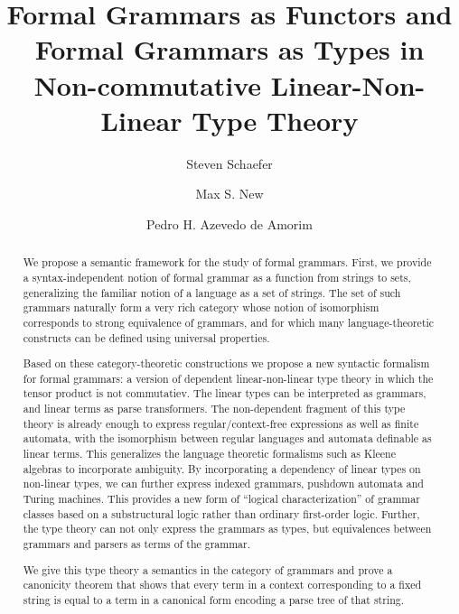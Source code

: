 \documentclass[sigconf,anonymous,review,screen]{acmart}
\begin{document}
\title{Formal Grammars as Functors and Formal Grammars as Types in Non-commutative Linear-Non-Linear Type Theory}
\author{Steven Schaefer}

\author{Max S. New}

\author{Pedro H. Azevedo de Amorim}

\begin{abstract}
  We propose a semantic framework for the study of formal
  grammars. First, we provide a syntax-independent notion of formal
  grammar as a function from strings to sets, generalizing the
  familiar notion of a language as a set of strings. The set of such
  grammars naturally form a very rich category whose notion of
  isomorphism corresponds to strong equivalence of grammars, and for
  which many language-theoretic constructs can be defined using
  universal properties.

  Based on these category-theoretic constructions we propose a new
  syntactic formalism for formal grammars: a version of dependent
  linear-non-linear type theory in which the tensor product is not
  commutatiev. The linear types can be interpreted as grammars, and
  linear terms as parse transformers. The non-dependent fragment of
  this type theory is already enough to express regular/context-free
  expressions as well as finite automata, with the isomorphism between
  regular languages and automata definable as linear terms. This
  generalizes the language theoretic formalisms such as Kleene
  algebras to incorporate ambiguity. By incorporating a dependency of
  linear types on non-linear types, we can further express indexed
  grammars, pushdown automata and Turing machines. This provides a new
  form of ``logical characterization'' of grammar classes based on a
  substructural logic rather than ordinary first-order logic. Further,
  the type theory can not only express the grammars as types, but
  equivalences between grammars and parsers as terms of the grammar.

  We give this type theory a semantics in the category of grammars and
  prove a canonicity theorem that shows that every term in a context
  corresponding to a fixed string is equal to a term in a canonical
  form encoding a parse tree of that string.
\end{abstract}
\end{document}
